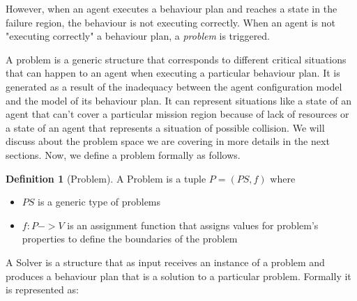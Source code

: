 \documentclass[journal]{IEEEtran}
\theoremstyle{definition}
\newtheorem{definition}{Definition}
\begin{document}



However, when an agent executes a behaviour plan and reaches a state in the failure region, the behaviour is not executing correctly. When an agent is not "executing correctly" a behaviour plan, a \textit{problem} is triggered.

A problem is a generic structure that corresponds to different critical situations that can happen to an agent when executing a particular behaviour plan. It is generated as a result of the inadequacy between the agent configuration model and the model of its behaviour plan. It can represent situations like a state of an agent that can't cover a particular mission region because of lack of resources or a state of an agent that represents a situation of possible collision.
We will discuss about the problem space  we are covering in more details in the next sections. Now, we define a problem formally as follows.


\begin{definition}[Problem]
A Problem is a tuple $P= (PS, f)$ where 
\begin{itemize}
\item $PS$ is a generic type of problems
\item  $f: P ->  V$ is an assignment function that assigns values for problem's properties to define the boundaries of the problem
\end{itemize}
\end{definition}






A Solver is a structure that as input receives an instance of a problem and produces a behaviour plan that is a solution to a particular problem. Formally it is represented as:
\end{document}
